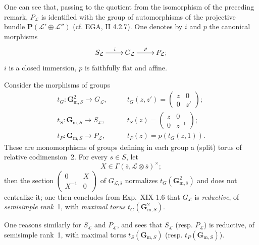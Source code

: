 One can see that, passing to the quotient from the isomorphism of the preceding remark, $P_{\mathcal L}$ is identified with the group of automorphisms of the projective bundle $\mathbf P(\mathcal L'\oplus\mathcal L'')$ (cf. EGA, II 4.2.7). One denotes by $i$ and $p$ the canonical morphisms
\[
\xymatrix{S_{\mathcal L}\ar[r]^i&G_{\mathcal L}\ar[r]^p&P_{\mathcal L};}
\]
$i$ is a closed immersion, $p$ is faithfully flat and affine.

 Consider the morphisms of groups
\[
\begin{aligned}
t_G:\mathbf G_{\mathrm m,S}^2\to G_{\mathcal L},&\qquad t_G(z,z')=\begin{pmatrix}z&0\\0&z'\end{pmatrix};\\
t_S:\mathbf G_{\mathrm m,S}\to S_{\mathcal L},&\qquad t_S(z)=\begin{pmatrix}z&0\\0&z^{-1}\end{pmatrix};\\
t_P:\mathbf G_{\mathrm m,S}\to P_{\mathcal L},&\qquad t_P(z)=p(t_G(z,1)).
\end{aligned}
\]
These are monomorphisms of groups defining in each group a (split) torus of relative codimension~2. For every $s\in S$, let
\[
X\in\Gamma(\overline{s},\mathcal L\otimes\overline{s})^\times;
\]
then the section $\left(\begin{smallmatrix}0&X\\X^{-1}&0\end{smallmatrix}\right)$ of $G_{\mathcal L,\overline{s}}$ normalizes $t_G(\mathbf G_{\mathrm m,\overline{s}}^2)$ and does not centralize it; one then concludes from Exp.~XIX 1.6 that $G_{\mathcal L}$ is \emph{reductive}, of \emph{semisimple rank}~1, with \emph{maximal torus} $t_G(\mathbf G_{\mathrm m,S}^2)$.

One reasons similarly for $S_{\mathcal L}$ and $P_{\mathcal L}$, and sees that $S_{\mathcal L}$ (resp. $P_{\mathcal L}$) is reductive, of semisimple rank~1, with maximal torus $t_S(\mathbf G_{\mathrm m,S})$ (resp. $t_P(\mathbf G_{\mathrm m,S})$).

